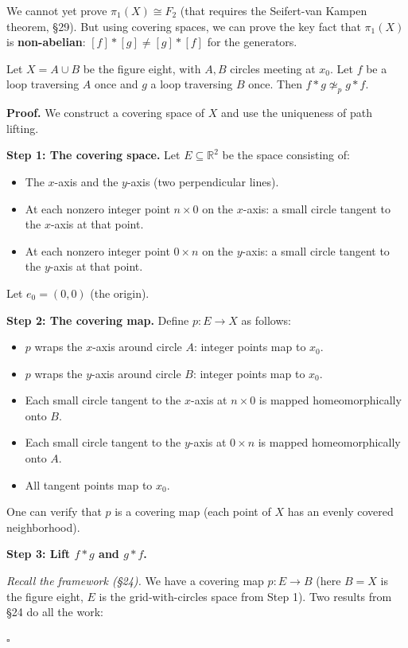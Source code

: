 \documentclass[11pt]{report}
\renewenvironment{proof}[1][Proof]{\noindent\textbf{#1.} }{\hfill$\square$\par\vspace{5pt}}
\begin{document}
We cannot yet prove $\pi_1(X) \cong F_2$ (that requires the Seifert-van Kampen theorem, \S 29). But using covering spaces, we can prove the key fact that $\pi_1(X)$ is \textbf{non-abelian}: $[f] * [g] \neq [g] * [f]$ for the generators.

\begin{thmbox}
Let $X = A \cup B$ be the figure eight, with $A, B$ circles meeting at $x_0$. Let $f$ be a loop traversing $A$ once and $g$ a loop traversing $B$ once. Then $f * g \not\simeq_p g * f$.
\end{thmbox}

\begin{proof}
We construct a covering space of $X$ and use the uniqueness of path lifting.

\textbf{Step 1: The covering space.} Let $E \subseteq \mathbb{R}^2$ be the space consisting of:
\begin{itemize}[nosep]
    \item The $x$-axis and the $y$-axis (two perpendicular lines).
    \item At each nonzero integer point $n \times 0$ on the $x$-axis: a small circle tangent to the $x$-axis at that point.
    \item At each nonzero integer point $0 \times n$ on the $y$-axis: a small circle tangent to the $y$-axis at that point.
\end{itemize}
Let $e_0 = (0, 0)$ (the origin).

\textbf{Step 2: The covering map.} Define $p: E \to X$ as follows:
\begin{itemize}[nosep]
    \item $p$ wraps the $x$-axis around circle $A$: integer points map to $x_0$.
    \item $p$ wraps the $y$-axis around circle $B$: integer points map to $x_0$.
    \item Each small circle tangent to the $x$-axis at $n \times 0$ is mapped homeomorphically onto $B$.
    \item Each small circle tangent to the $y$-axis at $0 \times n$ is mapped homeomorphically onto $A$.
    \item All tangent points map to $x_0$.
\end{itemize}
One can verify that $p$ is a covering map (each point of $X$ has an evenly covered neighborhood).

\textbf{Step 3: Lift $f * g$ and $g * f$.}

\textit{Recall the framework (\S 24).} We have a covering map $p: E \to B$ (here $B = X$ is the figure eight, $E$ is the grid-with-circles space from Step 1). Two results from \S 24 do all the work:


\end{proof}
\end{document}
